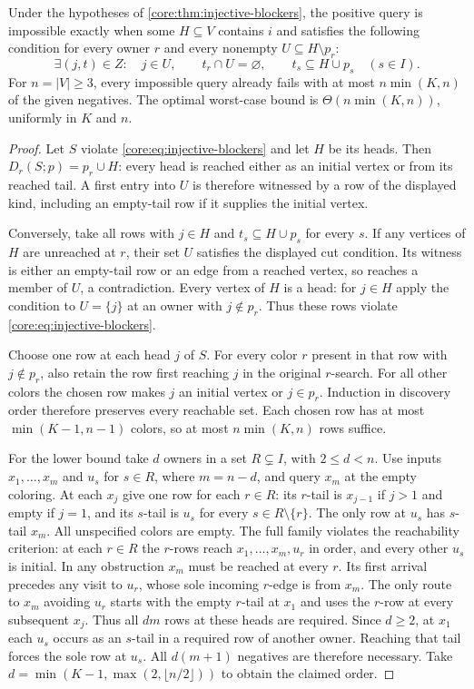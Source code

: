 \begin{corollary}\label{core:cor:input-guard-cuts}
Under the hypotheses of \cref{core:thm:injective-blockers}, the
positive query is impossible exactly when some $H\subseteq V$ contains
$i$ and satisfies the following condition for every owner $r$ and every
nonempty $U\subseteq H\setminus p_r$:
\[
 \exists (j,t)\in Z:\quad j\in U,\qquad
   t_r\cap U=\varnothing,\qquad t_s\subseteq H\cup p_s\quad(s\in I).
\]
For $n=|V|\ge3$, every impossible query already fails with at most
$n\min(K,n)$ of the given negatives. The optimal worst-case bound
is $\Theta(n\min(K,n))$, uniformly in $K$ and $n$.
\end{corollary}
\begin{proof}
Let $S$ violate \eqref{core:eq:injective-blockers} and let $H$ be its
heads. Then $D_r(S;p)=p_r\cup H$: every head is reached either as an
initial vertex or from its reached tail. A first entry into $U$ is
therefore witnessed by a row of the displayed kind, including an
empty-tail row if it supplies the initial vertex.

Conversely, take all rows with $j\in H$ and $t_s\subseteq H\cup p_s$
for every $s$. If any vertices of $H$ are unreached at $r$, their set
$U$ satisfies the displayed cut condition. Its witness is either an
empty-tail row or an edge from a reached vertex, so reaches a member
of $U$, a contradiction. Every vertex of $H$ is a head: for $j\in H$
apply the condition to $U=\{j\}$ at an owner with $j\notin p_r$.
Thus these rows violate \eqref{core:eq:injective-blockers}.

Choose one row at each head $j$ of $S$. For every color $r$ present
in that row with $j\notin p_r$, also retain the row first reaching $j$
in the original $r$-search. For all other colors the chosen row makes
$j$ an initial vertex or $j\in p_r$. Induction in discovery order
therefore preserves every reachable set. Each chosen row has at most
$\min(K-1,n-1)$ colors, so at most $n\min(K,n)$ rows suffice.

For the lower bound take $d$ owners in a set $R\subsetneq I$, with
$2\le d<n$. Use inputs $x_1,\ldots,x_m$ and $u_s$ for $s\in R$,
where $m=n-d$, and query $x_m$ at the empty coloring. At each $x_j$
give one row for each $r\in R$: its $r$-tail is $x_{j-1}$ if $j>1$
and empty if $j=1$, and its $s$-tail is $u_s$ for every $s\in
R\setminus\{r\}$. The only row at $u_s$ has $s$-tail $x_m$.
All unspecified colors are empty. The full family violates the
reachability criterion: at each $r\in R$ the $r$-rows reach
$x_1,\ldots,x_m,u_r$ in order, and every other $u_s$ is initial.
In any obstruction $x_m$ must be reached at every $r$. Its first
arrival precedes any visit to $u_r$, whose sole incoming $r$-edge is
from $x_m$. The only route to $x_m$ avoiding $u_r$ starts with the
empty $r$-tail at $x_1$ and uses the $r$-row at every subsequent $x_j$.
Thus all $dm$ rows at these heads are required. Since $d\ge2$, at $x_1$
each $u_s$ occurs as an $s$-tail in a required row of another owner.
Reaching that tail forces the sole row at $u_s$. All $d(m+1)$
negatives are therefore necessary. Take
$d=\min(K-1,\max(2,\lfloor n/2\rfloor))$ to obtain the claimed order.
\end{proof}

